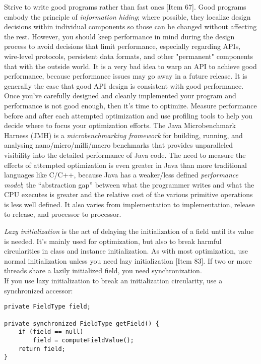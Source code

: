 \documentclass[8pt, table, xcdraw]{article}%
\begin{document}
Strive to write good programs rather than fast ones [Item 67]. Good programs embody the principle of \emph{information hiding}; where possible, they localize design decisions within individual components so those can be changed without affecting the rest. However, you should keep performance in mind during the design process to avoid decisions that limit performance, especially regarding APIs, wire-level protocols, persistent data formats, and other "permanent" components that with the outside world. It is a very bad idea to warp an API to achieve good performance, because performance issues may go away in a future release. It is generally the case that good API design is consistent with good performance. Once you’ve carefully designed and cleanly implemented your program and performance is not good enough, then it's time to optimize. Measure performance before and after each attempted optimization and use profiling tools to help you decide where to focus your optimization efforts. The Java Microbenchmark Harness (JMH) is a \emph{microbenchmarking framework} for building, running, and analysing nano/micro/milli/macro benchmarks that provides unparalleled visibility into the detailed performance of Java code. The need to measure the effects of attempted optimization is even greater in Java than more traditional languages like C/C++, because Java has a weaker/less defined \emph{performance model}; the “abstraction gap” between what the programmer writes and
what the CPU executes is greater and the relative cost of the various primitive operations is less well defined. It also varies from
implementation to implementation, release to release, and processor to processor.

\emph{Lazy initialization} is the act of delaying the initialization of a field until its value is needed. It's mainly used for optimization, but also to break harmful circularities in class and instance initialization. As with most optimization, use normal initialization unless you need lazy initialization [Item 83]. If two or more threads share a lazily initialized field, you need synchronization.\\
If you use lazy initialization to break an initialization circularity, use a synchronized accessor:

\begin{lstlisting}
private FieldType field;

private synchronized FieldType getField() {
    if (field == null)
        field = computeFieldValue();
    return field;
}
\end{lstlisting}
\end{document}
